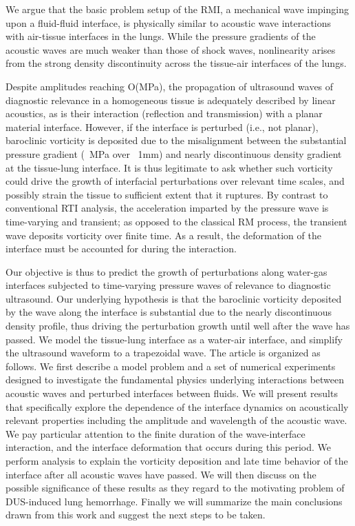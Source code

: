 \documentclass{jfm}%
\begin{document}

We argue that the basic problem setup of the \ac{RMI}, a mechanical
wave impinging upon a fluid-fluid interface, is physically similar to
acoustic wave interactions with air-tissue interfaces in the
lungs. While the pressure gradients of the acoustic waves are much
weaker than those of shock waves, nonlinearity arises from the strong
density discontinuity across the tissue-air interfaces of the lungs.

Despite amplitudes reaching O(MPa), the propagation of ultrasound
waves of diagnostic relevance in a homogeneous tissue is adequately
described by linear acoustics, as is their interaction (reflection and
transmission) with a planar material interface. However, if the
interface is perturbed (i.e., not planar), baroclinic vorticity is
deposited due to the misalignment between the substantial pressure
gradient (~MPa over ~1mm) and nearly discontinuous density gradient at
the tissue-lung interface. It is thus legitimate to ask whether such
vorticity could drive the growth of interfacial perturbations over
relevant time scales, and possibly strain the tissue to sufficient
extent that it ruptures. By contrast to conventional \ac{RTI}
analysis, the acceleration imparted by the pressure wave is
time-varying and transient; as opposed to the classical RM process,
the transient wave deposits vorticity over finite time. As a result,
the deformation of the interface must be accounted for during the
interaction.

Our objective is thus to predict the growth of perturbations along
water-gas interfaces subjected to time-varying pressure waves of
relevance to diagnostic ultrasound. Our underlying hypothesis is that
the baroclinic vorticity deposited by the wave along the interface is
substantial due to the nearly discontinuous density profile, thus
driving the perturbation growth until well after the wave has
passed. We model the tissue-lung interface as a water-air interface,
and simplify the ultrasound waveform to a trapezoidal wave. The
article is organized as follows. We first describe a model problem and
a set of numerical experiments designed to investigate the fundamental
physics underlying interactions between acoustic waves and perturbed
interfaces between fluids. We will present results that specifically
explore the dependence of the interface dynamics on acoustically
relevant properties including the amplitude and wavelength of the
acoustic wave. We pay particular attention to the finite duration of
the wave-interface interaction, and the interface deformation that
occurs during this period. We perform analysis to explain the
vorticity deposition and late time behavior of the interface after all
acoustic waves have passed. We will then discuss on the possible
significance of these results as they regard to the motivating problem
of \ac{DUS}-induced lung hemorrhage. Finally we will summarize the
main conclusions drawn from this work and suggest the next steps to be
taken.
\end{document}
